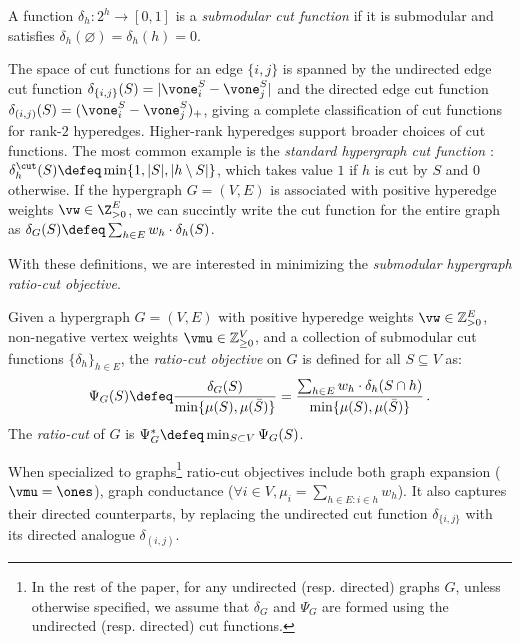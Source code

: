 \documentclass[letterpaper]{article}
\begin{document}
\begin{definition} \label{def.cut-function}
A function $\delta_h: 2^h \to [0,1]$ is a {\it submodular cut function} if it is submodular and satisfies $\delta_h(\varnothing) = \delta_h(h) = 0$.
\end{definition}

\noindent
The space of cut functions for an edge $\{ i, j \}$ is spanned by the undirected edge cut function
$\delta_{\{i,j\}}(S) = \lvert \vone^S_i - \vone^S_j\rvert$ and the directed edge cut function $\delta_{(i,j)}(S) = (\vone^S_i - \vone^S_j)_+$, giving a complete classification of cut functions for rank-$2$ hyperedges. Higher-rank hyperedges support broader choices of cut functions.
The most common example is the {\it standard hypergraph cut function}
\cite{chan2018spectral, louis2015hypergraph}: $\delta^{\cut}_h(S) \defeq \min\{ 1, \lvert S \rvert, \lvert h\setminus S \rvert \}$, which takes value $1$ if $h$ is cut by $S$ and $0$ otherwise. If the hypergraph $G = (V, E)$ is associated with positive hyperedge weights $\vw \in \Z^E_{> 0}$, we can succintly write the cut function for the entire graph as $\delta_G(S) \defeq \sum_{h \in E} w_h
\cdot \delta_h(S)$.

With these definitions, we are interested in minimizing the \emph{submodular hypergraph ratio-cut objective}.

\begin{definition} Given a hypergraph $G = (V, E)$ with positive hyperedge weights $\vw \in \mathbb{Z}^E_{>0}$, non-negative vertex weights $\vmu \in \mathbb{Z}^V_{\geq 0}$, and a collection of submodular cut functions $\{\delta_h\}_{h \in E}$, the \emph{ratio-cut objective} on $G$ is defined for all $S \subseteq V$ as:
\begin{equation*}
\Psi_G(S)
\defeq \frac{\delta_G(S)}{\min\{\mu(S),\mu(\bar{S})\}}
= \frac{\sum_{h \in E} w_h \cdot \delta_h(S\cap h)}{\min\{\mu(S),\mu(\bar{S})\}} \, .
\end{equation*}
The \emph{ratio-cut} of $G$ is $\Psi^*_G \defeq \min_{S \subset V} \Psi_G(S)$.
\end{definition}

\noindent
When specialized to graphs\footnote{In the rest of the paper, for any undirected (resp. directed) graphs $G$, unless otherwise specified, we assume that $\delta_G$ and $\Psi_G$ are formed using the undirected (resp. directed) cut functions.} ratio-cut objectives include  both graph expansion ($\vmu= \ones$), graph conductance ($\forall i \in V, \mu_i = \sum_{h \in E : i \in h} w_h$). It also captures their directed counterparts, by replacing the undirected cut function $\delta_{\{i,j\}}$ with its directed analogue $\delta_{(i,j)}$.
\end{document}
